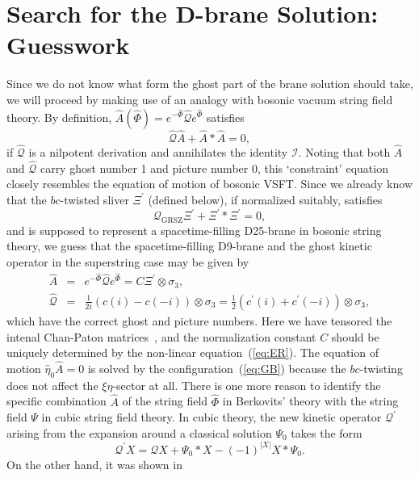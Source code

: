 \documentclass[a4paper,12pt]{article}
\newcommand{\cI}{\mathcal{I}}
\newcommand{\cQ}{\mathcal{Q}}
\newcommand{\Qmid}{\cQ_{\mathrm{GRSZ}}}
\newcommand{\sectiono}[1]{\section{#1}\setcounter{equation}{0}}
\begin{document}
\sectiono{Search for the D-brane Solution: Guesswork}\label{sec:4}
Since we do not know what form the ghost part of the brane solution should take, we will proceed 
by making use of an analogy with bosonic vacuum string field theory. 
By definition, $\widehat{A}(\widehat{\Phi})=e^{-\widehat{\Phi}}\widehat{\cQ}e^{\widehat{\Phi}}$ 
satisfies
\begin{equation}
\widehat{\cQ}\widehat{A}+\widehat{A}*\widehat{A}=0, \label{eq:ER}
\end{equation}
if $\widehat{\cQ}$ is a nilpotent derivation and annihilates the identity $\cI$. Noting that both $\widehat{A}$ 
and $\widehat{\cQ}$ carry ghost number 1 and picture number 0, this `constraint' equation closely resembles 
the equation of motion of bosonic VSFT. Since we already know that the $bc$-twisted sliver $\Xi^{\prime}$ 
(defined below), if normalized suitably, satisfies~\cite{GRSZ1}
\begin{equation}
\Qmid \Xi^{\prime}+\Xi^{\prime}*\Xi^{\prime}=0, \label{eq:ES}
\end{equation}
and is supposed to represent a spacetime-filling D25-brane in bosonic string theory, 
we guess that the spacetime-filling D9-brane and 
the ghost kinetic operator in the superstring case may be given by 
\begin{eqnarray}
\widehat{A}&=&e^{-\widehat{\Phi}}\widehat{\cQ}e^{\widehat{\Phi}}=C
\Xi^{\prime}\otimes\sigma_3, \label{eq:GB} \\
\widehat{\cQ}&=&\frac{1}{2i}(c(i)-c(-i))\otimes\sigma_3=\frac{1}{2}(c^{\prime}(i)+c^{\prime}(-i))\otimes
\sigma_3, \label{eq:ET}
\end{eqnarray}
which have the correct ghost and picture numbers. Here we have tensored the intenal Chan-Paton 
matrices~\cite{TPNS,BSZ}, and the normalization constant $C$ should be uniquely determined by 
the non-linear equation~(\ref{eq:ER}).
The equation of motion $\widehat{\eta}_0\widehat{A}=0$ is solved by the 
configuration~(\ref{eq:GB}) because the $bc$-twisting does not affect the $\xi\eta$-sector at all. 
There is one more reason to identify the specific combination $\widehat{A}$ of the string field 
$\widehat{\Phi}$ in Berkovits' theory with the string field $\Psi$ in cubic string field theory. 
In cubic theory, the new kinetic operator $\cQ^{\prime}$ arising from the expansion around a 
classical solution $\Psi_0$ takes the form 
\begin{equation}
\cQ^{\prime}X=\cQ X+\Psi_0*X-(-1)^{|X|}X*\Psi_0. \label{eq:RC}
\end{equation}
On the other hand, it was shown in~\cite{Klu5,MS} 
\end{document}
